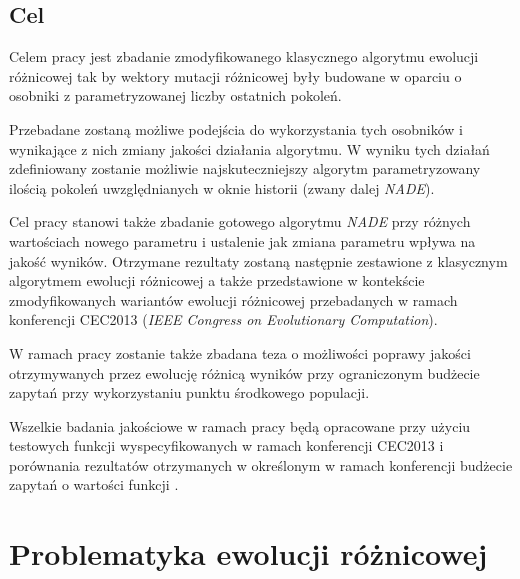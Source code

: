 \documentclass[12pt,a4paper]{report}
\begin{document}
{\section{Cel}
\par{
Celem pracy jest zbadanie zmodyfikowanego klasycznego algorytmu ewolucji różnicowej tak by wektory mutacji różnicowej były budowane w oparciu o osobniki z parametryzowanej liczby ostatnich pokoleń.
}
\par{
Przebadane zostaną możliwe podejścia do wykorzystania tych osobników i wynikające z nich zmiany jakości działania algorytmu. W wyniku tych działań zdefiniowany zostanie możliwie najskuteczniejszy algorytm parametryzowany ilością pokoleń uwzględnianych w oknie historii (zwany dalej \emph{NADE}).
}
\par{
Cel pracy stanowi także zbadanie gotowego algorytmu \emph{NADE} przy różnych wartościach nowego parametru i ustalenie jak zmiana parametru wpływa na jakość wyników. Otrzymane rezultaty zostaną następnie zestawione z klasycznym algorytmem ewolucji różnicowej a także przedstawione w kontekście zmodyfikowanych wariantów ewolucji różnicowej przebadanych w ramach konferencji CEC2013 (\emph{IEEE Congress on Evolutionary Computation}).
}
\par{
W ramach pracy zostanie także zbadana teza o możliwości poprawy jakości otrzymywanych przez ewolucję różnicą wyników przy ograniczonym budżecie zapytań przy wykorzystaniu punktu środkowego populacji.
}
\par{
Wszelkie badania jakościowe w ramach pracy będą opracowane przy użyciu testowych funkcji wyspecyfikowanych w ramach konferencji CEC2013 i porównania rezultatów otrzymanych w określonym w ramach konferencji budżecie zapytań o wartości funkcji \cite{Li13benchmarkfunctions}.
}




\chapter{Problematyka ewolucji różnicowej}
}
\end{document}
